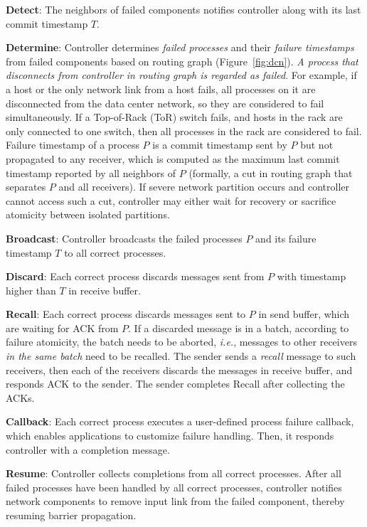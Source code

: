\begin{ecompact}
\item \textbf{Detect}: The neighbors of failed components notifies controller along with its last commit timestamp $T$.
\item \textbf{Determine}: Controller determines \emph{failed processes} and their \emph{failure timestamps} from failed components based on routing graph (Figure~\ref{fig:dcn}). \emph{A process that disconnects from controller in routing graph is regarded as failed}.
For example, if a host or the only network link from a host fails, all processes on it are disconnected from the data center network, so they are considered to fail simultaneously.
If a Top-of-Rack (ToR) switch fails, and hosts in the rack are only connected to one switch, then all processes in the rack are considered to fail.
Failure timestamp of a process $P$ is a commit timestamp sent by $P$ but not propagated to any receiver, which is computed as the maximum last commit timestamp reported by all neighbors of $P$ (formally, a cut in routing graph that separates $P$ and all receivers).
If severe network partition occurs and controller cannot access such a cut, controller may either wait for recovery or sacrifice atomicity between isolated partitions.
\item \textbf{Broadcast}: Controller broadcasts the failed processes $P$ and its failure timestamp $T$ to all correct processes.
\item \textbf{Discard}: Each correct process discards messages sent from $P$ with timestamp higher than $T$ in receive buffer.
\item \textbf{Recall}: Each correct process discards messages sent to $P$ in send buffer, which are waiting for ACK from $P$. If a discarded message is in a batch, according to failure atomicity, the batch needs to be aborted, \emph{i.e.}, messages to other receivers \emph{in the same batch} need to be recalled. The sender sends a \emph{recall} message to such receivers, then each of the receivers discards the messages in receive buffer, and responds ACK to the sender. The sender completes Recall after collecting the ACKs.
\item \textbf{Callback}: Each correct process executes a user-defined process failure callback, which enables applications to customize failure handling. Then, it responds controller with a completion message.
\item \textbf{Resume}: Controller collects completions from all correct processes.
After all failed processes have been handled by all correct processes, controller notifies network components to remove input link from the failed component, thereby resuming barrier propagation.
\end{ecompact}

